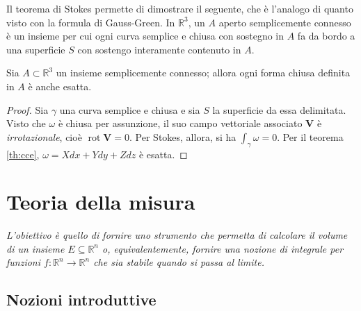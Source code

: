 \documentclass[11pt, a4paper]{scrartcl}
\theoremstyle{definition}
\numberwithin{esempio}{section}
\theoremstyle{definition}
\numberwithin{obs}{section}
\numberwithin{nota}{section}
\numberwithin{equation}{subsection}
\begin{document}
Il teorema di Stokes permette di dimostrare il seguente, che \`e l'analogo di quanto visto con la formula di Gauss-Green.
In $\mathbb{R}^3$, un $A$ aperto semplicemente connesso \`e un insieme per cui ogni curva semplice e chiusa con sostegno in $A$ fa da bordo a una superficie $S$ con sostengo interamente contenuto in $A$.
\begin{teorema}
	{}{}
Sia $A\subset \mathbb{R}^3$ un insieme semplicemente connesso; allora ogni forma chiusa definita in $A$ \`e anche esatta.
	\begin{proof}
	Sia $\gamma$ una curva semplice e chiusa e sia $S$ la superficie da essa delimitata.
	Visto che $\omega$ \`e chiusa per assunzione, il suo campo vettoriale associato $\mathbf{V} $ \`e \textit{irrotazionale}, cio\`e $\operatorname{rot} \mathbf{V} = 0$. 
	Per Stokes, allora, si ha $\int_{\gamma} \omega = 0$. 
	Per il teorema \ref{th:cce}, $\omega = Xdx + Ydy + Zdz$ \`e esatta.
	\end{proof}
\end{teorema}

\newpage
\section{Teoria della misura}
\begin{center}
	\textit{L’obiettivo \`e quello di fornire uno strumento che permetta di calcolare il volume di un insieme $E \subseteq \mathbb{R}^n$ o, equivalentemente, fornire una nozione di integrale per funzioni $f:\mathbb{R}^n\to \mathbb{R}^n $ che sia stabile quando si passa al
limite.}
\end{center}
\subsection{Nozioni introduttive}
\end{document}
